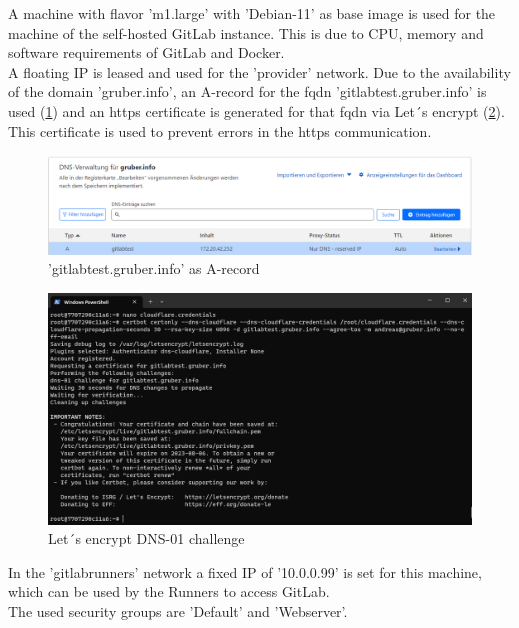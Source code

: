 A machine with flavor 'm1.large' with 'Debian-11' as base image is used for the machine of the self-hosted GitLab instance.
This is due to CPU, memory and software requirements of GitLab and Docker.\\

A floating IP is leased and used for the 'provider' network.
Due to the availability of the domain 'gruber.info', an A-record for the \ac{fqdn} 'gitlabtest.gruber.info' is used (\ref{fig:a_record}) and an https certificate is generated for that \ac{fqdn} via Let´s encrypt (\ref{fig:lets_encrypt}).
This certificate is used to prevent errors in the https communication.
\begin{figure}[H]
	\centering
	\includegraphics[width=14cm]{images/a-record.png}
	\caption{'gitlabtest.gruber.info' as A-record}
	\label{fig:a_record}
\end{figure}

\begin{figure}[H]
	\centering
	\includegraphics[width=14cm]{images/lets_encrypt.png}
	\caption{Let´s encrypt DNS-01 challenge}
	\label{fig:lets_encrypt}
\end{figure}

In the 'gitlabrunners' network a fixed IP of '10.0.0.99' is set for this machine, which can be used by the Runners to access GitLab.\\

The used security groups are 'Default' and 'Webserver'.\\

